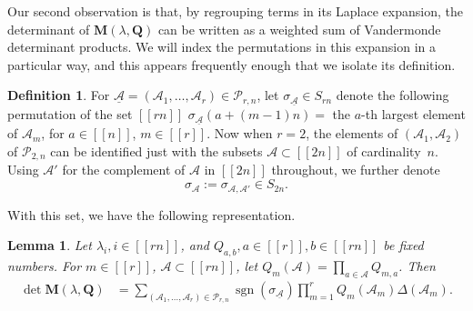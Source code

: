\documentclass[pdftex]{sigma}
\numberwithin{equation}{section}
\newtheorem{Lemma}[Theorem]{Lemma}
\theoremstyle{definition}
\newtheorem{Definition}[Theorem]{Definition}
\newcommand{\cP}{{\mathcal P}}
\newcommand{\sgn}{\operatorname{sgn}}
\newcommand{\cA}{\mathcal{A}}
\newcommand{\lst}[1]{[\![#1 ]\!]}
\newcommand{\mbf}[1]{\mathbf{#1}}
\begin{document}
Our second observation is that, by regrouping terms in its Laplace expansion, the determinant of $\mbf{M}(\lambda, \mbf{Q})$ can be
written as a weighted sum of Vandermonde determinant products. We will index the permutations in this expansion in a particular way, and this appears frequently enough that we isolate its definition.

\begin{Definition}
 For $\underline{\cA}=(\cA_1,\dots,\cA_r)\in \cP_{r,n}$, let $\sigma_{\underline{\cA}}\in S_{rn}$
 denote the following permutation of the set $\lst{rn}$
$
\sigma_{\underline{\cA}}(a+(m-1)n)= $ the $a$-th largest element of $ \cA_m$, for $a\in \lst{n}$, $ m\in \lst{r}$.
Now when $r=2$, the elements of $(\cA_1, \cA_2)$ of $\cP_{2,n}$ can be identified just with the subsets $\cA\subset \lst{2n}$ of cardinality~$n$. Using $\cA'$ for the complement of $\cA$ in $\lst{2n}$ throughout, we further denote
\begin{equation}
\label{shorthand}
\sigma_{{\cA}} := \sigma_{\cA, \cA'} \in S_{2n}.
\end{equation}

\end{Definition}


With this set, we have the following representation.

\begin{Lemma}\label{prop:M_expansion}
 Let $\lambda_i, i \in \lst{rn}$, and $Q_{a,b}, a\in \lst{r}, b\in \lst{rn}$ be fixed numbers. For $m\in \lst{r}$, $\cA\subset \lst{rn}$, let $Q_m(\cA)=\prod_{a\in \cA} Q_{m,a}$.
 Then
\begin{align*}\label{eq:detM}
 \det \mbf{M}({\lambda}, \mbf{Q})&= \sum_{(\cA_1,\dots,\cA_r)\in \cP_{r,n}} \!\!\sgn(\sigma_{\underline{\cA}}) \prod_{m=1}^r Q_{m}(\cA_m) \Delta(\cA_m).
\end{align*}
\end{Lemma}
\end{document}
